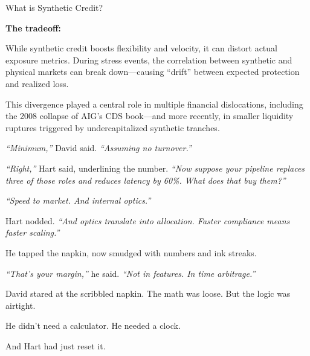 \begin{TechnicalSidebar}{What is Synthetic Credit?}
  \medskip
  
  \textbf{The tradeoff:}  
  
  \medskip

  While synthetic credit boosts flexibility and velocity, it can distort actual exposure metrics. During stress events, the correlation between synthetic and physical markets can break down—causing ``drift'' between expected protection and realized loss.

  \medskip
  
  This divergence played a central role in multiple financial dislocations, including the 2008 collapse of AIG’s CDS book—and more recently, in smaller liquidity ruptures triggered by undercapitalized synthetic tranches.
  
\end{TechnicalSidebar}

\medskip

\textit{``Minimum,''} David said. \textit{``Assuming no turnover.''}

\textit{``Right,''} Hart said, underlining the number. \textit{``Now suppose your pipeline replaces three of those roles 
and reduces latency by 60\%. What does that buy them?''}

\textit{``Speed to market. And internal optics.''}

Hart nodded. \textit{``And optics translate into allocation. Faster compliance means faster scaling.''}

He tapped the napkin, now smudged with numbers and ink streaks.

\textit{``That’s your margin,''} he said. \textit{``Not in features. In time arbitrage.''}

David stared at the scribbled napkin. The math was loose. But the logic was airtight.

He didn’t need a calculator. He needed a clock.

And Hart had just reset it.

\medskip


